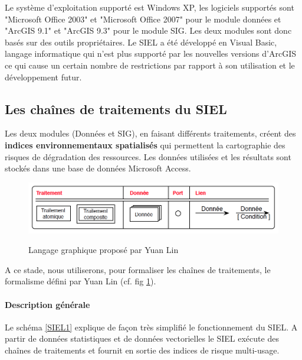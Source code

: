 Le système d'exploitation supporté est Windows XP, les logiciels supportés sont "Microsoft Office 2003" et "Microsoft Office 2007" pour le module données et "ArcGIS 9.1" et "ArcGIS 9.3" pour le module SIG. Les deux modules sont donc basés sur des outils propriétaires. Le SIEL a été développé en Visual Basic, langage informatique qui n'est plus supporté par les nouvelles versions d'ArcGIS ce qui cause un certain nombre de restrictions par rapport à son utilisation et le développement futur.

\subsection{Les chaînes de traitements du SIEL}

Les deux modules (Données et SIG), en faisant différents traitements, créent des \textbf{indices environnementaux spatialisés} qui permettent la cartographie des risques de dégradation des ressources. Les données utilisées et les résultats sont stockés dans une base de données Microsoft Access. 
\begin{figure}[H]
\begin{center}
\includegraphics[width=16cm]{LinGraphique}\\
\caption{\label{LinGraph} Langage graphique proposé par Yuan Lin \citep{Lin2011}}
\end{center}
\end{figure}
A ce stade, nous utiliserons, pour formaliser les chaînes de traitements, le formalisme défini par Yuan Lin (cf. fig \ref{LinGraph}).

\paragraph{Description générale\\}

Le schéma \ref{SIEL1} explique de façon très simplifié le fonctionnement du SIEL. A partir de données statistiques et de données vectorielles le SIEL exécute des chaînes de traitements et fournit en sortie des indices de risque multi-usage.

